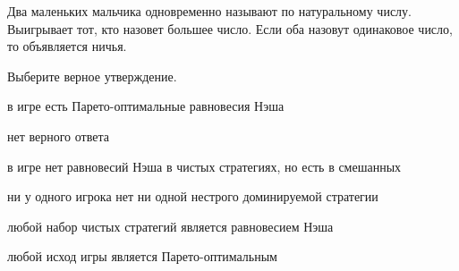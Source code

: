 
\begin{question}
Два маленьких мальчика одновременно называют по натуральному числу.
Выигрывает тот, кто назовет большее число. Если оба назовут одинаковое
число, то объявляется ничья.

Выберите верное утверждение.
\begin{answerlist}
  \item в игре есть Парето-оптимальные равновесия Нэша
  \item нет верного ответа
  \item в игре нет равновесий Нэша в чистых стратегиях, но есть в смешанных
  \item ни у одного игрока нет ни одной нестрого доминируемой стратегии
  \item любой набор чистых стратегий является равновесием Нэша
  \item любой исход игры является Парето-оптимальным
\end{answerlist}
\end{question}


